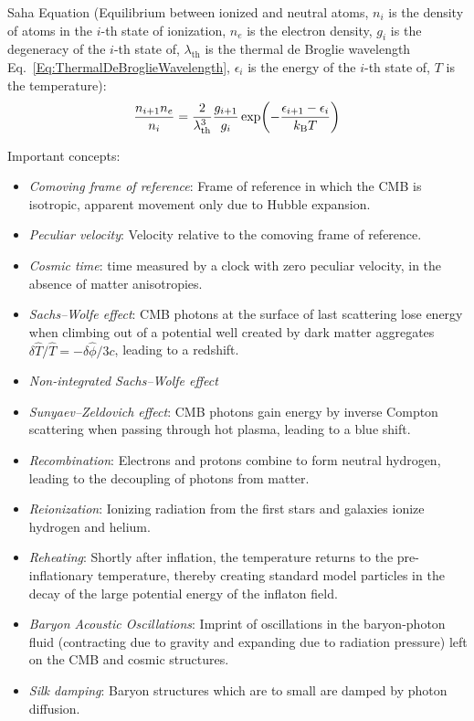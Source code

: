 		\noindent
		Saha Equation (Equilibrium between ionized and neutral atoms, $n_i$ is the density of atoms in the $i$-th state of ionization, $n_e$ is the electron density, $g_i$ is the degeneracy of the $i$-th state of, $\lambda_\text{th}$ is the thermal de Broglie wavelength Eq.~\ref{Eq:ThermalDeBroglieWavelength}, $\epsilon_i$ is the energy of the $i$-th state of, $T$ is the temperature):
		\begin{equation}
			\frac{n_{i+1} n_e}{n_i} = \frac{2}{\lambda_\text{th}^3} \frac{g_{i+1}}{g_i} \exp(- \frac{\epsilon_{i+1}-\epsilon_{i}}{k_{\text{B}} T})
		\end{equation}


		\noindent
		Important concepts:
		\begin{itemize}
			\item \emph{Comoving frame of reference}: Frame of reference in which the CMB is isotropic, apparent movement only due to Hubble expansion.
			\item \emph{Peculiar velocity}: Velocity relative to the comoving frame of reference.
			\item \emph{Cosmic time}: time measured by a clock with zero peculiar velocity, in the absence of matter anisotropies.
			\item \emph{Sachs--Wolfe effect}: CMB photons at the surface of last scattering lose energy when climbing out of a potential well created by dark matter aggregates $\delta \hat{T} / \hat{T} = -\delta \hat{\phi} / 3c$, leading to a redshift.
			\item \emph{Non-integrated Sachs--Wolfe effect}
			\item \emph{Sunyaev--Zeldovich effect}: CMB photons gain energy by inverse Compton scattering when passing through hot plasma, leading to a blue shift.
			\item \emph{Recombination}: Electrons and protons combine to form neutral hydrogen, leading to the decoupling of photons from matter.
			\item \emph{Reionization}: Ionizing radiation from the first stars and galaxies ionize hydrogen and helium.
			\item \emph{Reheating}: Shortly after inflation, the temperature returns to the pre-inflationary temperature, thereby creating standard model particles in the decay of the large potential energy of the inflaton field.
			\item \emph{Baryon Acoustic Oscillations}: Imprint of oscillations in the baryon-photon fluid (contracting due to gravity and expanding due to radiation pressure) left on the CMB and cosmic structures.
			\item \emph{Silk damping}: Baryon structures which are to small are damped by photon diffusion.
		\end{itemize}

